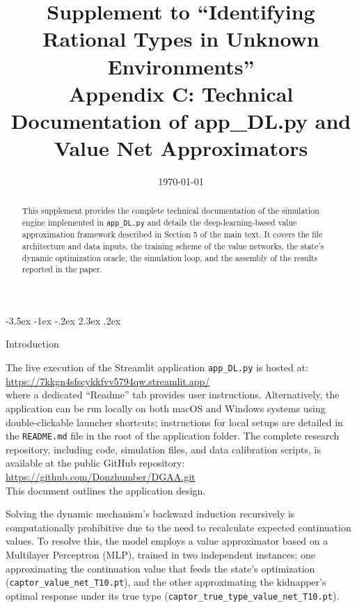 \documentclass[12pt]{article}
\makeatletter
\newcommand{\pyfile}[1]{\texttt{#1}}
\numberwithin{equation}{section}
\numberwithin{table}{section}
\renewcommand\section{\@startsection {section}{1}{\z@}%
                                   {-3.5ex \@plus -1ex \@minus -.2ex}%
                                   {2.3ex \@plus.2ex}%
                                   {\normalfont\Large\bfseries\raggedright}}
\makeatother
\begin{document}
\title{Supplement to ``Identifying Rational Types in Unknown Environments''\\
Appendix C: Technical Documentation of app\_DL.py and Value Net Approximators}
\author{}
\date{\today}
\maketitle

\begin{abstract}
\singlespacing
This supplement provides the complete technical documentation of the simulation engine implemented in \pyfile{app\_DL.py} and details the deep-learning-based value approximation framework described in Section 5 of the main text. It covers the file architecture and data inputs, the training scheme of the value networks, the state's dynamic optimization oracle, the simulation loop, and the assembly of the results reported in the paper.
\end{abstract}

\section{Introduction}

The live execution of the Streamlit application \pyfile{app\_DL.py} is hosted at:\\
\url{https://7kkgn4sfscykkfvv5794qw.streamlit.app/}\\
where a dedicated ``Readme'' tab provides user instructions. Alternatively, the application can be run locally on both macOS and Windows systems using double-clickable launcher shortcuts; instructions for local setups are detailed in the \texttt{README.md} file in the root of the application folder. The complete research repository, including code, simulation files, and data calibration scripts, is available at the public GitHub repository:\\
\url{https://github.com/Donzhumber/DGAA.git}\\
This document outlines the application design.

Solving the dynamic mechanism's backward induction recursively is computationally prohibitive due to the need to recalculate expected continuation values. To resolve this, the model employs a value approximator based on a Multilayer Perceptron (MLP), trained in two independent instances: one approximating the continuation value that feeds the state's optimization (\pyfile{captor\_value\_net\_T10.pt}), and the other approximating the kidnapper's optimal response under its true type (\pyfile{captor\_true\_type\_value\_net\_T10.pt}).
\end{document}
